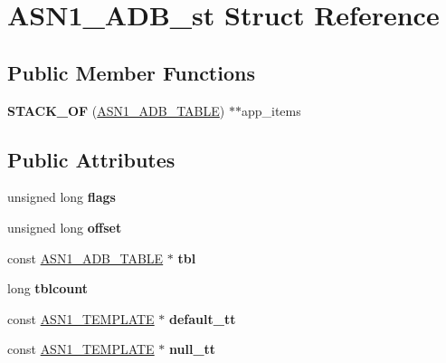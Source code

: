 \hypertarget{struct_a_s_n1___a_d_b__st}{}\section{A\+S\+N1\+\_\+\+A\+D\+B\+\_\+st Struct Reference}
\label{struct_a_s_n1___a_d_b__st}
\subsection*{Public Member Functions}
\begin{DoxyCompactItemize}
\item 
\mbox{\label{struct_a_s_n1___a_d_b__st_af70b602678a9eb933e47dfa284a6e178}} 
{\bfseries S\+T\+A\+C\+K\+\_\+\+OF} (\hyperlink{struct_a_s_n1___a_d_b___t_a_b_l_e__st}{A\+S\+N1\+\_\+\+A\+D\+B\+\_\+\+T\+A\+B\+LE}) $\ast$$\ast$app\+\_\+items
\end{DoxyCompactItemize}
\subsection*{Public Attributes}
\begin{DoxyCompactItemize}
\item 
\mbox{\label{struct_a_s_n1___a_d_b__st_a54eb419e2b98aef6bdb2eb51f6cc1e64}} 
unsigned long {\bfseries flags}
\item 
\mbox{\label{struct_a_s_n1___a_d_b__st_a62226ed62585729d4c60b6a238e4c10a}} 
unsigned long {\bfseries offset}
\item 
\mbox{\label{struct_a_s_n1___a_d_b__st_a82869e99ac7536c3368719f3dc2be71c}} 
const \hyperlink{struct_a_s_n1___a_d_b___t_a_b_l_e__st}{A\+S\+N1\+\_\+\+A\+D\+B\+\_\+\+T\+A\+B\+LE} $\ast$ {\bfseries tbl}
\item 
\mbox{\label{struct_a_s_n1___a_d_b__st_a329d8b9d61abbc5fed3507e68f21c656}} 
long {\bfseries tblcount}
\item 
\mbox{\label{struct_a_s_n1___a_d_b__st_a4d859d4ce5127475bdd551ea9cda1814}} 
const \hyperlink{struct_a_s_n1___t_e_m_p_l_a_t_e__st}{A\+S\+N1\+\_\+\+T\+E\+M\+P\+L\+A\+TE} $\ast$ {\bfseries default\+\_\+tt}
\item 
\mbox{\label{struct_a_s_n1___a_d_b__st_a1254bc85d4f82423f0c402af13a97045}} 
const \hyperlink{struct_a_s_n1___t_e_m_p_l_a_t_e__st}{A\+S\+N1\+\_\+\+T\+E\+M\+P\+L\+A\+TE} $\ast$ {\bfseries null\+\_\+tt}
\end{DoxyCompactItemize}


